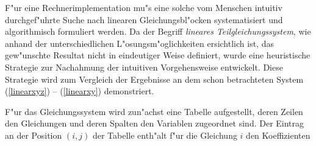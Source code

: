 F"ur eine Rechnerimplementation mu"s eine solche vom Menschen intuitiv 
durchgef"uhrte Suche nach linearen Gleichungsbl"ocken systematisiert und
algorithmisch formuliert werden. Da der Begriff {\em lineares
Teilgleichungssystem}, wie anhand der unterschiedlichen 
L"osungsm"oglichkeiten ersichtlich ist, das gew"unschte Resultat nicht
in eindeutiger Weise definiert, wurde eine heuristische Strategie zur 
Nachahmung der intuitiven Vorgehensweise entwickelt. Diese Strategie
wird  zum Vergleich der Ergebnisse an dem schon betrachteten System
(\ref{linearxyz}) -- (\ref{linearxy}) demonstriert.

F"ur das Gleichungssystem wird zun"achst eine Tabelle aufgestellt, deren
Zeilen den Gleichungen und deren Spalten den Variablen zugeordnet sind.
Der Eintrag an der Position $(i,j)$ der Tabelle enth"alt f"ur die  
Gleichung $i$ den Koeffizienten


